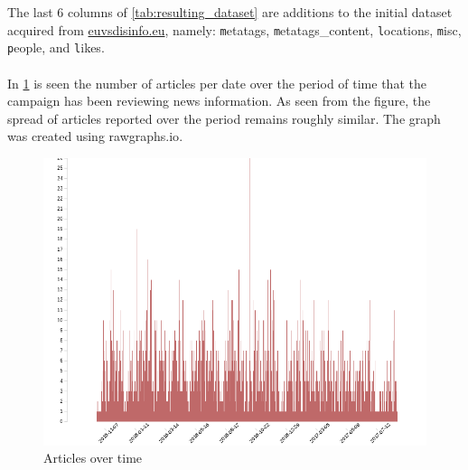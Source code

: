 \documentclass{article}
\begin{document}
The last $6$ columns of \cref{tab:resulting_dataset} are additions to the initial dataset acquired from \href{https://www.euvsdisinfo.eu}{euvsdisinfo.eu}, namely: {\texttt metatags}, {\texttt metatags\_content}, {\texttt locations}, {\texttt misc}, {\texttt people}, and {\texttt likes}.
\\\\
In \cref{fig:articles_over_time} is seen the number of articles per date over the period of time that the campaign has been reviewing news information. As seen from the figure, the spread of articles reported over the period remains roughly similar. The graph was created using rawgraphs.io\cite{Mauri:2017:RVP:3125571.3125585}. 
\begin{figure}[H]
    \caption{Articles over time}
    \label{fig:articles_over_time}
    \includegraphics[width=\textwidth]{images/articles_per_date.png}
\end{figure}
\end{document}
